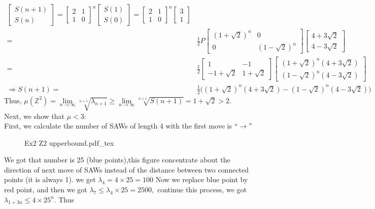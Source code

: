 \documentclass[12pt,a4paper]{report}
\theoremstyle{definition}
\newcommand{\incfig}[1]{%
{#1.pdf_tex}
}
\begin{document}
\begin{enumerate}
\begin{enumerate}
\begin{align*}
\begin{bmatrix}
	    S(n+1)\\
	    S(n)
	    \end{bmatrix}=\begin{bmatrix}
	    2 & 1\\
	    1 & 0
	    \end{bmatrix}^n\begin{bmatrix}
	    S(1)\\
	    S(0)
	    \end{bmatrix}=\begin{bmatrix}
	    2 & 1\\
	    1 & 0
	    \end{bmatrix}^n\begin{bmatrix}
	    3\\
	    1
	    \end{bmatrix}\\
	    =& \frac{1}{2}P\begin{bmatrix}
	    (1+\sqrt{2})^n & 0\\
	    0 & (1-\sqrt{2})^n
	    \end{bmatrix}\begin{bmatrix}
	    4+3\sqrt{2}\\
	    4-3\sqrt{2}
	    \end{bmatrix}\\
	    =& \frac{1}{2}\begin{bmatrix}
	    1 & -1\\
	    -1+\sqrt{2} & 1+\sqrt{2}
	    \end{bmatrix}\begin{bmatrix}
	    (1+\sqrt{2})^n(4+3\sqrt{2})\\
	    (1-\sqrt{2})^n(4-3\sqrt{2})
	    \end{bmatrix}\\
	    \Rightarrow S(n+1)=& \frac{1}{2}\Big((1+\sqrt{2})^n(4+3\sqrt{2})-(1-\sqrt{2})^n(4-3\sqrt{2})\Big)
	    \end{align*}
	    Thus, $\mu(\mathbb{Z}^2)=\lim\limits_{n\to\infty}\sqrt[n+1]{\lambda_{n+1}}\geq \lim\limits_{n\to\infty}\sqrt[n+1]{S(n+1)}=1+\sqrt{2}>2.$\\[5pt]
	    Next, we show that $\mu<3:$\\
	    First, we calculate the number of SAWs of length 4 with the first move is $``\rightarrow"$
	    \newpage
		\begin{figure}[htp]
		\centering
		\def\svgwidth{8cm}
		\incfig{Ex2 Z2 upperbound}
		\end{figure}
		We got that number is 25 (blue points),this figure concentrate about the direction of next move of SAWs instead of the distance between two connected points (it is always 1). we get $\lambda_{4}=4\times 25=100$ Now we replace blue point by red point, and then we got $\lambda_7\leq \lambda_4\times 25=2500,$ continue this process, we got $\lambda_{1+3n}\leq 4\times 25^n.$ Thus 

\end{enumerate}
\end{enumerate}
\end{document}
